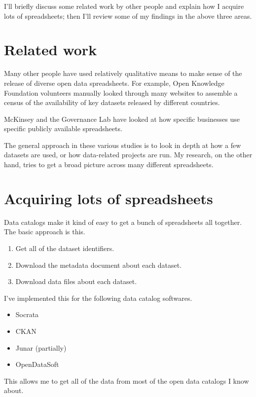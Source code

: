 \documentclass{acm_proc_article-sp}
\begin{document}
I'll briefly discuss some related work by other people and explain how I
acquire lots of spreadsheets; then I'll review some of my findings in the
above three areas.

\section{Related work}
Many other people have used relatively qualitative means to make sense of
the release of diverse open data spreadsheets.
For example, Open Knowledge Foundation volunteers manually looked through
many websites to assemble a census \cite{open-data-census}
of the availability of key datasets released by different countries.

McKinsey \cite{mckinsey} and the Governance Lab \cite{govlab,joel}
have looked at how specific businesses use specific publicly available spreadsheets.

The general approach in these various studies is to look in depth at how a
few datasets are used, or how data-related projects are run. My research,
on the other hand, tries to get a broad picture across many different spreadsheets.

\section{Acquiring lots of spreadsheets}
Data catalogs make it kind of easy to get a bunch of spreadsheets all together.
The basic approach is this.

\begin{enumerate}
\item Get all of the dataset identifiers.
\item Download the metadata document about each dataset.
\item Download data files about each dataset.
\end{enumerate}

I've implemented this for the following data catalog softwares.

\begin{itemize}
\item Socrata
\item CKAN
\item Junar (partially)
\item OpenDataSoft
\end{itemize}

This allows me to get all of the data from most of the open data catalogs I know about.
\end{document}

